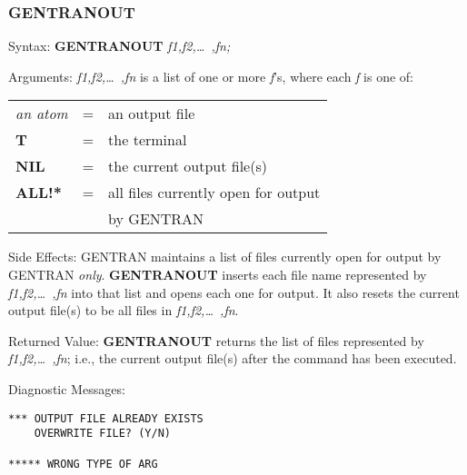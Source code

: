 \subsubsection{GENTRANOUT}
\begin{describe}{Syntax:}
{\bf GENTRANOUT} {\it f1,f2,\dots\ ,fn;}
\end{describe}
\begin{describe}{Arguments:}
{\it f1,f2,\dots\ ,fn\/} is a list of one or more {\it f\/}'s, where each 
{\it f\/} is one of:
\begin{center}
\begin{tabular}{lll}
{\it an atom} & = & an output file\\
{\bf T} & = & the terminal\\
{\bf NIL} & = & the current output file(s)\\
{\bf ALL!*} & = & all files currently open for output \\
& & by GENTRAN\\
\end{tabular}
\end{center}
\end{describe}
\begin{describe}{Side Effects:}
GENTRAN maintains a list of files currently open for output by
GENTRAN {\it only}.  {\bf GENTRANOUT} inserts each file name represented by
{\it f1,f2,\dots\ ,fn\/} into that list and opens each one for output.  It
also resets the current output file(s) to be all files in {\it f1,f2,\dots\
 ,fn}.
\end{describe}
\begin{describe}{Returned Value:}
{\bf GENTRANOUT} returns the list of files represented by
{\it f1,f2,\dots\ ,fn\/};
i.e., the current output file(s) after the command has been executed.
\end{describe}
\begin{describe}{Diagnostic Messages:}
\begin{verbatim}
*** OUTPUT FILE ALREADY EXISTS
    OVERWRITE FILE? (Y/N)

***** WRONG TYPE OF ARG
\end{verbatim}
\end{describe}
